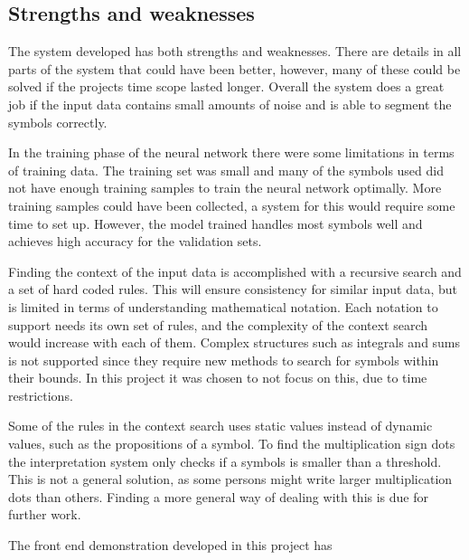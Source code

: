 

\subsection{Strengths and weaknesses}

The system developed has both strengths and weaknesses. There are details in all parts of the system that could have been better, however, many of these could be solved if the projects time scope lasted longer. Overall the system does a great job if the input data contains small amounts of noise and is able to segment the symbols correctly. %

In the training phase of the neural network there were some limitations in terms of training data. The training set was small and many of the symbols used did not have enough training samples to train the neural network optimally. More training samples could have been collected, a system for this would require some time to set up. However, the model trained handles most symbols well and achieves high accuracy for the validation sets.



Finding the context of the input data is accomplished with a recursive search and a set of hard coded rules. This will ensure consistency for similar input data, but is limited in terms of understanding mathematical notation. Each notation to support needs its own set of rules, and the complexity of the context search would increase with each of them. Complex structures such as integrals and sums is not supported since they require new methods to search for symbols within their bounds. In this project it was chosen to not focus on this, due to time restrictions.

Some of the rules in the context search uses static values instead of dynamic values, such as the propositions of a symbol. To find the multiplication sign dots the interpretation system only checks if a symbols is smaller than a threshold. This is not a general solution, as some persons might write larger multiplication dots than others. Finding a more general way of dealing with this is due for further work. 


The front end demonstration developed in this project has 

